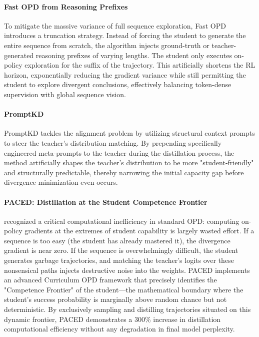 \paragraph{Fast OPD from Reasoning Prefixes}
To mitigate the massive variance of full sequence exploration, Fast OPD \citep{2602.15260} introduces a truncation strategy. Instead of forcing the student to generate the entire sequence from scratch, the algorithm injects ground-truth or teacher-generated reasoning prefixes of varying lengths. The student only executes on-policy exploration for the suffix of the trajectory. This artificially shortens the RL horizon, exponentially reducing the gradient variance while still permitting the student to explore divergent conclusions, effectively balancing token-dense supervision with global sequence vision.

\paragraph{PromptKD}
PromptKD \citep{2402.12842} tackles the alignment problem by utilizing structural context prompts to steer the teacher's distribution matching. By prepending specifically engineered meta-prompts to the teacher during the distillation process, the method artificially shapes the teacher's distribution to be more "student-friendly" and structurally predictable, thereby narrowing the initial capacity gap before divergence minimization even occurs.

\paragraph{PACED: Distillation at the Student Competence Frontier}
\citet{2603.11178} recognized a critical computational inefficiency in standard OPD: computing on-policy gradients at the extremes of student capability is largely wasted effort. If a sequence is too easy (the student has already mastered it), the divergence gradient is near zero. If the sequence is overwhelmingly difficult, the student generates garbage trajectories, and matching the teacher's logits over these nonsensical paths injects destructive noise into the weights. PACED implements an advanced Curriculum OPD framework that precisely identifies the "Competence Frontier" of the student—the mathematical boundary where the student's success probability is marginally above random chance but not deterministic. By exclusively sampling and distilling trajectories situated on this dynamic frontier, PACED demonstrates a 300\% increase in distillation computational efficiency without any degradation in final model perplexity.

